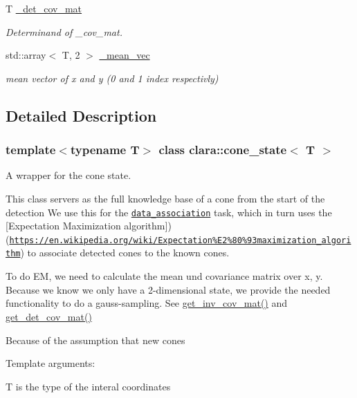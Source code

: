 \begin{DoxyCompactItemize}
T \hyperlink{classclara_1_1cone__state_aa42f4654a82f825dc3b89d4ec0b03deb}{\+\_\+det\+\_\+cov\+\_\+mat}
\begin{DoxyCompactList}\small\item\em Determinand of \+\_\+cov\+\_\+mat. \end{DoxyCompactList}\item 
std\+::array$<$ T, 2 $>$ \hyperlink{classclara_1_1cone__state_abf600e69be6a3791caefb93b214bb3b5}{\+\_\+mean\+\_\+vec}
\begin{DoxyCompactList}\small\item\em mean vector of x and y (0 and 1 index respectivly) \end{DoxyCompactList}\end{DoxyCompactItemize}


\subsection{Detailed Description}
\subsubsection*{template$<$typename T$>$\newline
class clara\+::cone\+\_\+state$<$ T $>$}

A wrapper for the cone state. 

This class servers as the full knowledge base of a cone from the start of the detection We use this for the \href{data_association.h}{\tt data\+\_\+association} task, which in turn uses the \mbox{[}Expectation Maximization algorithm\mbox{]})(\href{https://en.wikipedia.org/wiki/Expectation%E2%80%93maximization_algorithm}{\tt https\+://en.\+wikipedia.\+org/wiki/\+Expectation\%\+E2\%80\%93maximization\+\_\+algorithm}) to associate detected cones to the known cones.

To do EM, we need to calculate the mean und covariance matrix over {\ttfamily x, y}. Because we know we only have a 2-\/dimensional state, we provide the needed functionality to do a gauss-\/sampling. See {\ttfamily \hyperlink{classclara_1_1cone__state_a7a0584b86ba125a2c232f26d4d1e4a38}{get\+\_\+inv\+\_\+cov\+\_\+mat()}} and {\ttfamily \hyperlink{classclara_1_1cone__state_a5775993f75df93a3121c1fb53ef48777}{get\+\_\+det\+\_\+cov\+\_\+mat()}}

Because of the assumption that new cones

Template arguments\+:
\begin{DoxyItemize}
\item {\ttfamily T} is the type of the interal coordinates
\end{DoxyItemize}

